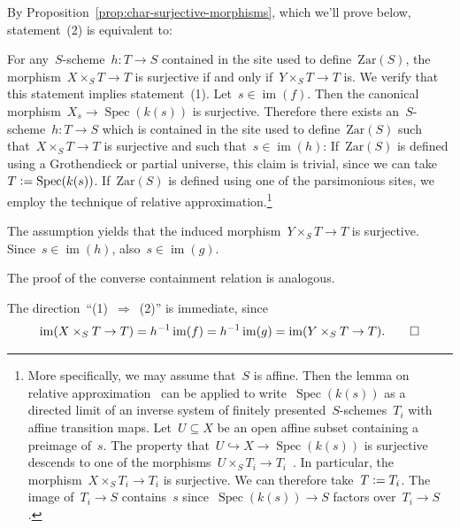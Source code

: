 \documentclass[10pt,reqno,a4paper]{amsbook}
\makeatletter
\theoremstyle{definition}
\theoremstyle{plain}
\theoremstyle{remark}
\newcommand{\Zar}{\mathrm{Zar}}
\DeclareMathOperator{\Spec}{Spec}
\DeclareMathOperator{\im}{im}
\newcommand{\?}{\,{:}\,}
\renewcommand{\_}{\mathpunct{.}\,}
\newcommand{\stacksproject}[1]{\cite[{\href{http://stacks.math.columbia.edu/tag/#1}{Tag~#1}}]{stacks-project}}
\newenvironment{indentblock}{%
  \list{}{\leftmargin\leftmargin}%
  \item\relax
}{%
  \endlist
}
\newcommand{\defeq}{\vcentcolon=}
\renewenvironment{proof}[1][\proofname]{\par
  \pushQED{\qed}%
  \normalfont \topsep6\p@\@plus6\p@\relax
  \trivlist
  \item[\hskip\labelsep
        \itshape
    #1\@addpunct{.}]\ignorespaces
}{%
  \popQED\endtrivlist\@endpefalse
}
\makeatother
\begin{document}
\begin{proof}By Proposition~\ref{prop:char-surjective-morphisms}, which we'll
prove below, statement~(2) is equivalent to:
\begin{indentblock}
For any~$S$-scheme~$h : T \to S$ contained in the site used to
define~$\Zar(S)$, the morphism~$X \times_S T \to T$ is surjective if and only
if~$Y \times_S T \to T$ is.
\end{indentblock}
We verify that this statement implies statement~(1). Let~$s \in \im(f)$. Then the canonical
morphism~$X_s \to \Spec(k(s))$ is surjective. Therefore there exists
an~$S$-scheme~$h : T \to S$ which is contained in the site used to
define~$\Zar(S)$ such that~$X \times_S T \to T$ is surjective and such that~$s
\in \im(h)$: If~$\Zar(S)$ is defined using a Grothendieck or partial universe,
this claim is trivial, since we can take~$T \defeq \Spec(k(s))$. If~$\Zar(S)$
is defined using one of the parsimonious sites, we employ the technique of
relative approximation.\footnote{More specifically, we may assume that~$S$ is
affine. Then the lemma on relative approximation~\stacksproject{09MV} can be
applied to write~$\Spec(k(s))$ as a directed limit of an inverse system of
finitely presented~$S$-schemes~$T_i$ with affine transition maps. Let~$U
\subseteq X$ be an open affine subset containing a preimage of~$s$. The
property that~$U \hookrightarrow X \to \Spec(k(s))$ is surjective descends to
one of the morphisms~$U \times_S T_i \to T_i$~\stacksproject{07RR}. In
particular, the morphism~$X \times_S T_i \to T_i$ is surjective. We can
therefore take~$T \defeq T_i$. The image of~$T_i \to S$ contains~$s$
since~$\Spec(k(s)) \to S$ factors over~$T_i \to S$.}

The assumption yields that the induced morphism~$Y \times_S T \to T$ is
surjective. Since~$s \in \im(h)$, also~$s \in \im(g)$.

The proof of the converse containment relation is analogous.

The direction~``(1)~$\Rightarrow$~(2)'' is immediate, since
\[ \im(X \times_S T \to T) = h^{-1} \im(f) = h^{-1} \im(g) = \im(Y \times_S T \to T).
  \qedhere \]
\end{proof}
\end{document}
